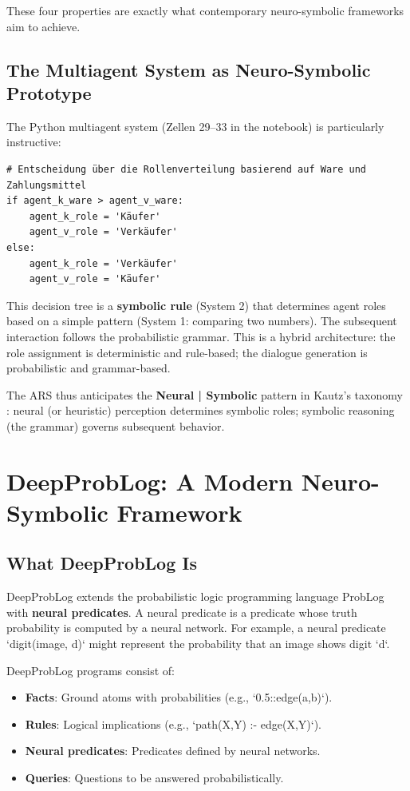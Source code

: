 \documentclass[12pt,a4paper]{article}
\begin{document}
These four properties are exactly what contemporary neuro-symbolic frameworks 
aim to achieve.

\subsection{The Multiagent System as Neuro-Symbolic Prototype}

The Python multiagent system (Zellen 29--33 in the notebook) is particularly 
instructive:

\begin{lstlisting}[caption=Multiagent Role Assignment]
# Entscheidung über die Rollenverteilung basierend auf Ware und Zahlungsmittel
if agent_k_ware > agent_v_ware:
    agent_k_role = 'Käufer'
    agent_v_role = 'Verkäufer'
else:
    agent_k_role = 'Verkäufer'
    agent_v_role = 'Käufer'
\end{lstlisting}

This decision tree is a \textbf{symbolic rule} (System 2) that determines agent 
roles based on a simple pattern (System 1: comparing two numbers). The subsequent 
interaction follows the probabilistic grammar. This is a hybrid architecture: 
the role assignment is deterministic and rule-based; the dialogue generation 
is probabilistic and grammar-based.

The ARS thus anticipates the \textbf{Neural | Symbolic} pattern in Kautz's 
taxonomy \citep{kautz2020third}: neural (or heuristic) perception determines 
symbolic roles; symbolic reasoning (the grammar) governs subsequent behavior.

\section{DeepProbLog: A Modern Neuro-Symbolic Framework}

\subsection{What DeepProbLog Is}

DeepProbLog \citep{manhaeve2018deepproblog} extends the probabilistic logic 
programming language ProbLog with \textbf{neural predicates}. A neural predicate 
is a predicate whose truth probability is computed by a neural network. For 
example, a neural predicate `digit(image, d)` might represent the probability 
that an image shows digit `d`.

DeepProbLog programs consist of:

\begin{itemize}
    \item \textbf{Facts}: Ground atoms with probabilities (e.g., `0.5::edge(a,b)`).
    \item \textbf{Rules}: Logical implications (e.g., `path(X,Y) :- edge(X,Y)`).
    \item \textbf{Neural predicates}: Predicates defined by neural networks.
    \item \textbf{Queries}: Questions to be answered probabilistically.
\end{itemize}
\end{document}
